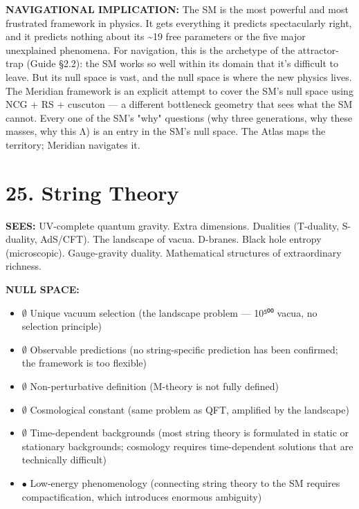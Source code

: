 \textbf{NAVIGATIONAL IMPLICATION:} The SM is the most powerful and most frustrated framework in physics. It gets everything it predicts spectacularly right, and it predicts nothing about its \textasciitilde{}19 free parameters or the five major unexplained phenomena. For navigation, this is the archetype of the attractor-trap (Guide §2.2): the SM works so well within its domain that it's difficult to leave. But its null space is vast, and the null space is where the new physics lives. The Meridian framework is an explicit attempt to cover the SM's null space using NCG + RS + cuscuton — a different bottleneck geometry that sees what the SM cannot. Every one of the SM's "why" questions (why three generations, why these masses, why this Λ) is an entry in the SM's null space. The Atlas maps the territory; Meridian navigates it.


\bigskip\noindent\makebox[\textwidth]{\color{rulegray}\rule{5cm}{0.3pt}}\bigskip


\section*{25. String Theory}


\textbf{SEES:} UV-complete quantum gravity. Extra dimensions. Dualities (T-duality, S-duality, AdS/CFT). The landscape of vacua. D-branes. Black hole entropy (microscopic). Gauge-gravity duality. Mathematical structures of extraordinary richness.


\textbf{NULL SPACE:}

\begin{itemize}[nosep,leftmargin=*]
  \item $\emptyset$ Unique vacuum selection (the landscape problem — 10⁵⁰⁰ vacua, no selection principle)
  \item $\emptyset$ Observable predictions (no string-specific prediction has been confirmed; the framework is too flexible)
  \item $\emptyset$ Non-perturbative definition (M-theory is not fully defined)
  \item $\emptyset$ Cosmological constant (same problem as QFT, amplified by the landscape)
  \item $\emptyset$ Time-dependent backgrounds (most string theory is formulated in static or stationary backgrounds; cosmology requires time-dependent solutions that are technically difficult)
  \item $\bullet$ Low-energy phenomenology (connecting string theory to the SM requires compactification, which introduces enormous ambiguity)
\end{itemize}


